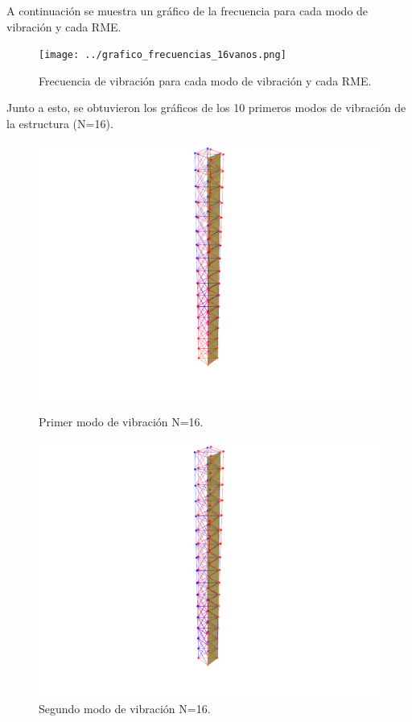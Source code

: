 A continuación se muestra un gráfico de la frecuencia para cada modo de vibración y cada RME. 

\begin{figure}[H]
    \centering
    \texttt{[image: ../grafico\_frecuencias\_16vanos.png]}
    \caption{Frecuencia de vibración para cada modo de vibración y cada RME.}
\end{figure}

Junto a esto, se obtuvieron los gráficos de los 10 primeros modos de vibración de la estructura (N=16).

\begin{figure}[H]
    \begin{minipage}[b]{0.5\textwidth}
        \centering
        \includegraphics[width=\textwidth]{FOTOS/mod1_16.png}
        \caption{Primer modo de vibración N=16.}
    \end{minipage}
    \hfill
    \begin{minipage}[b]{0.5\textwidth}
        \centering
        \includegraphics[width=\textwidth]{FOTOS/mod2_16.png}
        \caption{Segundo modo de vibración N=16.}
    \end{minipage}
\end{figure}

